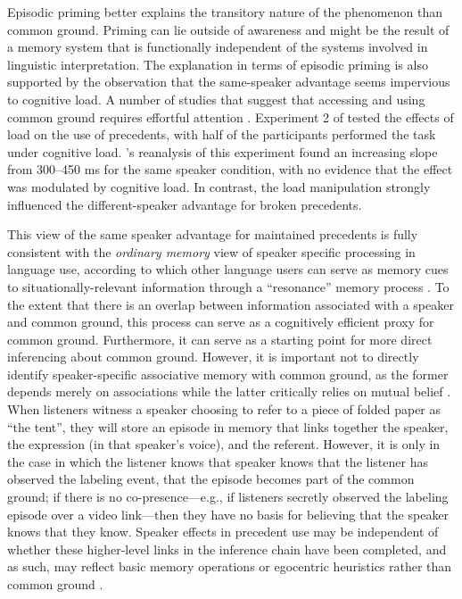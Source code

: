 \documentclass[doc,fignum,apacite,floatsintext]{apa6}
\begin{document}
Episodic priming better explains the transitory nature of the phenomenon than common ground.  Priming can lie outside of awareness and might be the result of a memory system that is functionally independent of the systems involved in linguistic interpretation.  The explanation in terms of episodic priming is also supported by the observation that the same-speaker advantage seems impervious to cognitive load.  A number of studies that suggest that accessing and using common ground requires effortful attention \cite{brown-schmidt09exec,nilsengraham09,rossnagel00}.  Experiment 2 of  tested the effects of load on the use of precedents, with half of the participants performed the task under cognitive load.  's reanalysis of this experiment found an increasing slope from 300--450 ms for the same speaker condition, with no evidence that the effect was modulated by cognitive load.  In contrast, the load manipulation strongly influenced the different-speaker advantage for broken precedents.

This view of the same speaker advantage for maintained precedents is fully consistent with the \textit{ordinary memory} view of speaker specific processing in language use, according to which other language users can serve as memory cues to situationally-relevant information through a ``resonance'' memory process \cite{hortongerrig05a}.  To the extent that there is an overlap between information associated with a speaker and common ground, this process can serve as a cognitively efficient proxy for common ground.  Furthermore, it can serve as a starting point for more direct inferencing about common ground.  However, it is important not to directly identify speaker-specific associative memory with common ground, as the former depends merely on associations while the latter critically relies on mutual belief \cite{clarkmarshall81}.  When listeners witness a speaker choosing to refer to a piece of folded paper as ``the tent'', they will store an episode in memory that links together the speaker, the expression (in that speaker's voice), and the referent.  However, it is only in the case in which the listener knows that speaker knows that the listener has observed the labeling event, that the episode becomes part of the common ground; if there is no co-presence---e.g., if listeners secretly observed the labeling episode over a video link---then they have no basis for believing that the speaker knows that they know.  Speaker effects in precedent use may be independent of whether these higher-level links in the inference chain have been completed, and as such, may reflect basic memory operations or egocentric heuristics rather than common ground \cite{shintelkeysar07}.  
\end{document}
